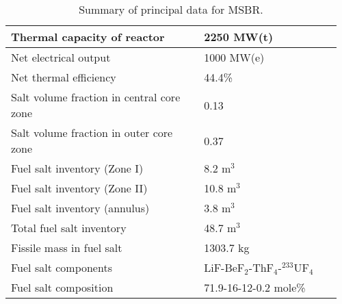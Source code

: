 \begin{table}[h!]
        \caption{Summary of principal data for MSBR.}
        \begin{tabular}{|m{0.56\linewidth} | m{0.40\linewidth}|}
        \hline
                Thermal capacity of reactor           & 2250 MW(t)
                \\ [5pt] \hline
                Net electrical output                 & 1000 MW(e) 
                \\ [5pt] \hline
                Net thermal efficiency        & 44.4\%
                \\ [5pt] \hline
                Salt volume fraction in central core zone     & 0.13
                \\ [5pt] \hline
                Salt volume fraction in outer core zone       & 0.37
                \\ [5pt] \hline
                Fuel salt inventory (Zone I)                  & 8.2 m$^3$	
                \\ [5pt] \hline
                Fuel salt inventory (Zone II)                 & 10.8 m$^3$	
                \\ [5pt] \hline
                Fuel salt inventory (annulus)                 & 3.8 m$^3$	
                \\ [5pt] \hline
                Total fuel salt inventory                     & 48.7 m$^3$	
                \\ [5pt] \hline
                Fissile mass in fuel salt                   & 1303.7 kg	
                \\ [5pt] \hline
                Fuel salt components                  & 
                LiF-BeF$_2$-ThF$_4$-$^{233}$UF$_4$	
                \\ [5pt] \hline
                Fuel salt composition                 & 
                71.9-16-12-0.2 mole\%
                \\\hline
        \end{tabular}
        \label{tab:msbr_tab}
\end{table}


